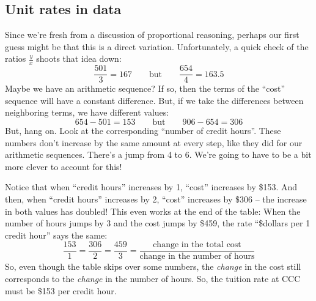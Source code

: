 \subsection{Unit rates in data}

Since we're fresh from a discussion of proportional reasoning, perhaps our first guess might be that this is a direct variation. Unfortunately, a quick check of the ratios $\frac{y}{x}$ shoots that idea down: \[\frac{501}{3} = 167 \qquad\text{but}\qquad \frac{654}{4} = 163.5\]
Maybe we have an arithmetic sequence? If so, then the terms of the ``cost'' sequence will have a constant difference. But, if we take the differences between neighboring terms, we have different values: \[654 - 501 = 153 \qquad\text{but}\qquad 906-654 = 306\]
But, hang on. Look at the corresponding ``number of credit hours''. These numbers don't increase by the same amount at every step, like they did for our arithmetic sequences. There's a jump from 4 to 6. We're going to have to be a bit more clever to account for this!

Notice that when ``credit hours'' increases by 1, ``cost'' increases by \$153. And then, when ``credit hours'' increases by 2, ``cost'' increases by \$306 -- the increase in both values has doubled! This even works at the end of the table: When the number of hours jumps by 3 and the cost jumps by \$459, the rate ``\$dollars per 1 credit hour'' says the same:
\[\frac{153}{1} = \frac{306}{2} = \frac{459}{3} = \frac{\text{change in the total cost}}{\text{change in the number of hours}}\]
So, even though the table skips over some numbers, the \textit{change} in the cost still corresponds to the \textit{change} in the number of hours. So, the tuition rate at CCC must be \$153 per credit hour.



